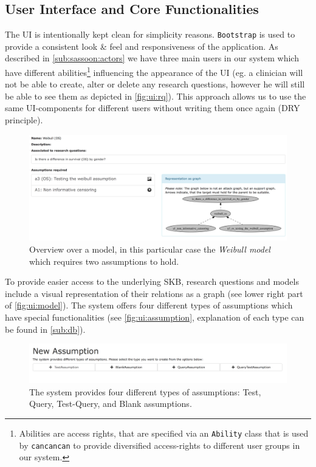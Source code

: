 \subsection{User Interface and Core Functionalities}
\label{sub:ui}

The \gls{UI} is intentionally kept clean for simplicity reasons. \texttt{Bootstrap} is used to provide a consistent look \& feel and responsiveness of the application. As described in \autoref{sub:sassoon:actors} we have three main users in our system which have different abilities\footnote{Abilities are access rights, that are specified via an \texttt{Ability} class that is used by \texttt{cancancan} to provide diversified access-rights to different user groups in our system.} influencing the appearance of the \gls{UI} (eg. a clinician will not be able to create, alter or delete any research questions, however he will still be able to see them as depicted in \autoref{fig:ui:rq}). This approach allows us to use the same \gls{UI}-components for different users without writing them once again (\gls{DRY} principle).

\begin{figure}[tbp]
\centering
\includegraphics[width=\textwidth]{figures/ui_Weibull_Model}
\caption{Overview over a model, in this particular case the \textit{Weibull model} which requires two assumptions to hold.}
\label{fig:ui:model}
\end{figure}


To provide easier access to the underlying \gls{SKB}, research questions and models include a visual representation of their relations as a graph (see lower right part of \autoref{fig:ui:model}). The system offers four different types of assumptions which have special functionalities (see \autoref{fig:ui:assumption}, explanation of each type can be found in \autoref{sub:db}).


\begin{figure}[btp]
	\centering
	\includegraphics[width=\textwidth]{figures/ui_new_assumption}
	\caption{The system provides four different types of assumptions: Test, Query, Test-Query, and Blank assumptions.}
	\label{fig:ui:assumption}
\end{figure}

